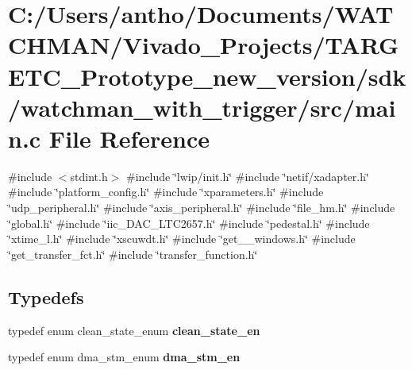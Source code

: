 \section{C\+:/\+Users/antho/\+Documents/\+W\+A\+T\+C\+H\+M\+A\+N/\+Vivado\+\_\+\+Projects/\+T\+A\+R\+G\+E\+T\+C\+\_\+\+Prototype\+\_\+new\+\_\+version/sdk/watchman\+\_\+with\+\_\+trigger/src/main.c File Reference}
\label{main_8c}
{\ttfamily \#include $<$stdint.\+h$>$}\newline
{\ttfamily \#include \char`\"{}lwip/init.\+h\char`\"{}}\newline
{\ttfamily \#include \char`\"{}netif/xadapter.\+h\char`\"{}}\newline
{\ttfamily \#include \char`\"{}platform\+\_\+config.\+h\char`\"{}}\newline
{\ttfamily \#include \char`\"{}xparameters.\+h\char`\"{}}\newline
{\ttfamily \#include \char`\"{}udp\+\_\+peripheral.\+h\char`\"{}}\newline
{\ttfamily \#include \char`\"{}axis\+\_\+peripheral.\+h\char`\"{}}\newline
{\ttfamily \#include \char`\"{}file\+\_\+hm.\+h\char`\"{}}\newline
{\ttfamily \#include \char`\"{}global.\+h\char`\"{}}\newline
{\ttfamily \#include \char`\"{}iic\+\_\+\+D\+A\+C\+\_\+\+L\+T\+C2657.\+h\char`\"{}}\newline
{\ttfamily \#include \char`\"{}pedestal.\+h\char`\"{}}\newline
{\ttfamily \#include \char`\"{}xtime\+\_\+l.\+h\char`\"{}}\newline
{\ttfamily \#include \char`\"{}xscuwdt.\+h\char`\"{}}\newline
{\ttfamily \#include \char`\"{}get\+\_\+\_\+windows.\+h\char`\"{}}\newline
{\ttfamily \#include \char`\"{}get\+\_\+transfer\+\_\+fct.\+h\char`\"{}}\newline
{\ttfamily \#include \char`\"{}transfer\+\_\+function.\+h\char`\"{}}\newline
\subsection*{Typedefs}
\begin{DoxyCompactItemize}
\item 
\mbox{\label{main_8c_a747618975efd65f2d75229ff858b5942}} 
typedef enum clean\+\_\+state\+\_\+enum {\bfseries clean\+\_\+state\+\_\+en}
\item 
\mbox{\label{main_8c_a970b102bbdd60f6404a88223e16800fb}} 
typedef enum dma\+\_\+stm\+\_\+enum {\bfseries dma\+\_\+stm\+\_\+en}
\end{DoxyCompactItemize}
